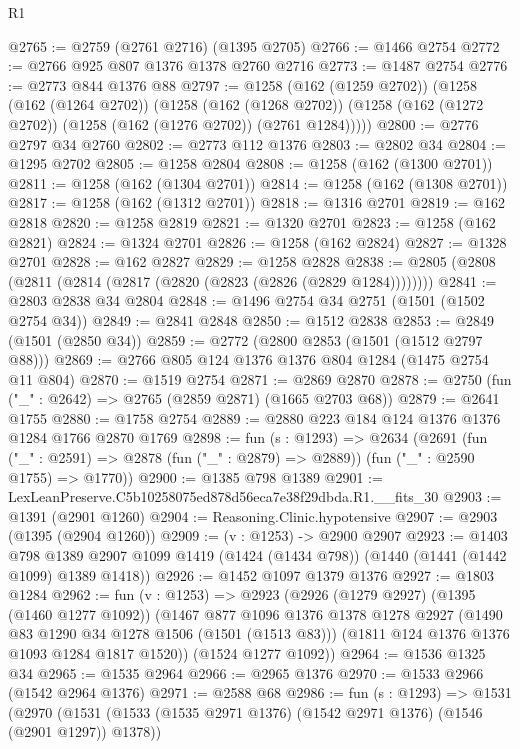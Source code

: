\begin{lexlean}{R1}
\begin{coremodule}
@2765 := @2759 (@2761 @2716) (@1395 @2705)
@2766 := @1466 @2754
@2772 := @2766 @925 @807 @1376 @1378 @2760 @2716
@2773 := @1487 @2754
@2776 := @2773 @844 @1376 @88
@2797 := @1258
    (@162 (@1259 @2702))
    (@1258
      (@162 (@1264 @2702))
      (@1258
        (@162 (@1268 @2702))
        (@1258 (@162 (@1272 @2702)) (@1258 (@162 (@1276 @2702)) (@2761 @1284)))))
@2800 := @2776 @2797 @34 @2760
@2802 := @2773 @112 @1376
@2803 := @2802 @34
@2804 := @1295 @2702
@2805 := @1258 @2804
@2808 := @1258 (@162 (@1300 @2701))
@2811 := @1258 (@162 (@1304 @2701))
@2814 := @1258 (@162 (@1308 @2701))
@2817 := @1258 (@162 (@1312 @2701))
@2818 := @1316 @2701
@2819 := @162 @2818
@2820 := @1258 @2819
@2821 := @1320 @2701
@2823 := @1258 (@162 @2821)
@2824 := @1324 @2701
@2826 := @1258 (@162 @2824)
@2827 := @1328 @2701
@2828 := @162 @2827
@2829 := @1258 @2828
@2838 := @2805 (@2808 (@2811 (@2814 (@2817 (@2820 (@2823 (@2826 (@2829 @1284))))))))
@2841 := @2803 @2838 @34 @2804
@2848 := @1496 @2754 @34 @2751 (@1501 (@1502 @2754 @34))
@2849 := @2841 @2848
@2850 := @1512 @2838
@2853 := @2849 (@1501 (@2850 @34))
@2859 := @2772 (@2800 @2853 (@1501 (@1512 @2797 @88)))
@2869 := @2766 @805 @124 @1376 @1376 @804 @1284 (@1475 @2754 @11 @804)
@2870 := @1519 @2754
@2871 := @2869 @2870
@2878 := @2750 (fun ("_" : @2642) => @2765 (@2859 @2871) (@1665 @2703 @68))
@2879 := @2641 @1755
@2880 := @1758 @2754
@2889 := @2880 @223 @184 @124 @1376 @1376 @1284 @1766 @2870 @1769
@2898 := fun (s : @1293) =>
  @2634
    (@2691
      (fun ("_" : @2591) => @2878 (fun ("_" : @2879) => @2889))
      (fun ("_" : @2590 @1755) => @1770))
@2900 := @1385 @798 @1389
@2901 := LexLeanPreserve.C5b10258075ed878d56eca7e38f29dbda.R1.__fits_30
@2903 := @1391 (@2901 @1260)
@2904 := Reasoning.Clinic.hypotensive
@2907 := @2903 (@1395 (@2904 @1260))
@2909 := (v : @1253) -> @2900 @2907
@2923 := @1403
    @798
    @1389
    @2907
    @1099
    @1419
    (@1424 (@1434 @798))
    (@1440 (@1441 (@1442 @1099) @1389 @1418))
@2926 := @1452 @1097 @1379 @1376
@2927 := @1803 @1284
@2962 := fun (v : @1253) =>
  @2923
    (@2926
      (@1279 @2927)
      (@1395 (@1460 @1277 @1092))
      (@1467
        @877
        @1096
        @1376
        @1378
        @1278
        @2927
        (@1490 @83 @1290 @34 @1278 @1506 (@1501 (@1513 @83)))
        (@1811 @124 @1376 @1376 @1093 @1284 @1817 @1520))
      (@1524 @1277 @1092))
@2964 := @1536 @1325 @34
@2965 := @1535 @2964
@2966 := @2965 @1376
@2970 := @1533 @2966 (@1542 @2964 @1376)
@2971 := @2588 @68
@2986 := fun (s : @1293) =>
  @1531
    (@2970
      (@1531 (@1533 (@1535 @2971 @1376) (@1542 @2971 @1376) (@1546 (@2901 @1297)) @1378))

\end{coremodule}
\end{lexlean}
